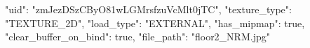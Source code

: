 {
    "uid": "zmJezDSzCByO81wLGMrsfzuVcMlt0jTC",
    "texture_type": "TEXTURE_2D",
    "load_type": "EXTERNAL",
    "has_mipmap": true,
    "clear_buffer_on_bind": true,
    "file_path": "floor2_NRM.jpg"
}